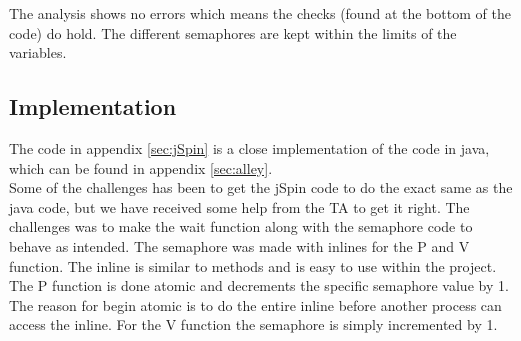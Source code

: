 The analysis shows no errors which means the checks (found at the bottom of the code) do hold. The different semaphores are kept within the limits of the variables. 

\subsection{Implementation}
The code in appendix \ref{sec:jSpin} is a close implementation of the code in java, which can be found in appendix \ref{sec:alley}.
\\

Some of the challenges has been to get the jSpin code to do the exact same as the java code, but we have received some help from the TA to get it right. The challenges was to make the wait function along with the semaphore code to behave as intended. The semaphore was made with inlines for the P and V function. The inline is similar to methods and is easy to use within the project. The P function is done atomic and decrements the specific semaphore value by 1. The reason for begin atomic is to do the entire inline before another process can access the inline. For the V function the semaphore is simply incremented by 1.